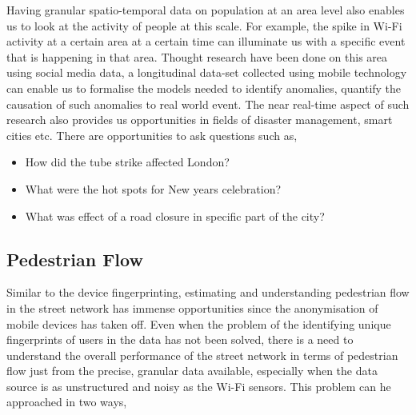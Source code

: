 
Having granular spatio-temporal data on population at an area level also enables us to look at the activity of people at this scale.
For example, the spike in Wi-Fi activity at a certain area at a certain time can illuminate us with a specific event that is happening in that area.
Thought research have been done on this area using social media data, a longitudinal data-set collected using mobile technology can enable us to formalise the models needed to identify anomalies, quantify the causation of such anomalies to real world event.
The near real-time aspect of such research also provides us opportunities in fields of disaster management, smart cities etc. 
There are opportunities to ask questions such as,

\begin{itemize}
  \setlength{\itemindent}{2em}
  \itemsep-0.25em
  \item How did the tube strike affected London?
  \item What were the hot spots for New years celebration?
  \item What was effect of a road closure in specific part of the city?
\end{itemize}

\subsection{Pedestrian Flow}

Similar to the device fingerprinting, estimating and understanding pedestrian flow in the street network has immense opportunities since the anonymisation of mobile devices has taken off.
Even when the problem of the identifying unique fingerprints of users in the data has not been solved, there is a need to understand the overall performance of the street network in terms of pedestrian flow just from the precise, granular data available, especially when the data source is as unstructured and noisy as the Wi-Fi sensors.
This problem can he approached in two ways,


